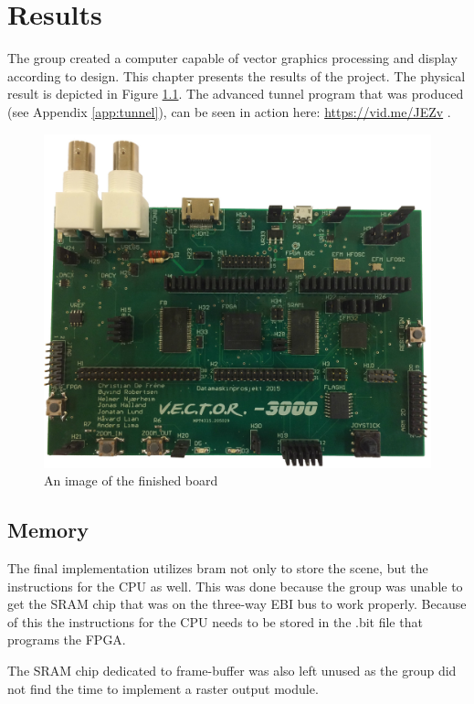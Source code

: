 \chapter{Results}

The group created a computer capable of vector graphics processing and display according to design.
This chapter presents the results of the project.
The physical result is depicted in Figure \ref{fig:board-top}.
The advanced tunnel program that was produced (see Appendix \ref{app:tunnel}), can be seen in action here: \href{https://vid.me/JEZv}{https://vid.me/JEZv} \cite{tunnel-demo}.

\begin{figure}[h!]
	    \includegraphics[width=\linewidth]{images/board_top.jpg}
	    \caption{An image of the finished \vthreek board}
	    \label{fig:board-top}
\end{figure}

\section{Memory}

The final implementation utilizes \gls{bram} not only to store the scene, but the instructions for the CPU as well.
This was done because the group was unable to get the SRAM chip that was on the three-way EBI bus to work properly.
Because of this the instructions for the CPU needs to be stored in the .bit file that programs the FPGA.

The SRAM chip dedicated to frame-buffer was also left unused as the group did not find the time to implement a raster output module.

